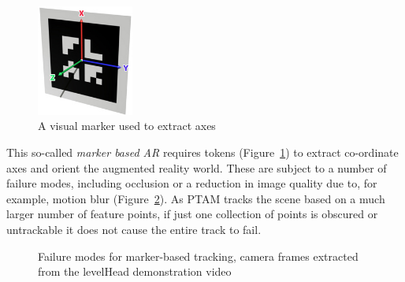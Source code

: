 \documentclass[a4paper,10pt]{article}
\begin{document}
\begin{figure}
  \begin{center}
    \includegraphics[width=120px]{marker-axis1}
  \end{center}
  \vspace{-10pt}
  \caption{A visual marker used to extract axes}
  \vspace{-20pt}
  \label{markerar}
\end{figure}
 This so-called \textit{marker based AR} requires tokens (Figure~\ref{markerar}) to extract co-ordinate axes and orient the augmented reality world. These are subject to a number of failure modes, including occlusion or a reduction in image quality due to, for example, motion blur (Figure~\ref{markerfail}). As PTAM tracks the scene based on a much larger number of feature points, if just one collection of points is obscured or untrackable it does not cause the entire track to fail.

\begin{figure}[t]
    \vspace{10pt}
    \quad
    \vspace{10pt}
    \caption{Failure modes for marker-based tracking, camera frames extracted from the levelHead demonstration video}
    \vspace{10pt}
    \label{markerfail}
\end{figure}
\end{document}
